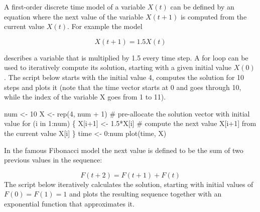 \documentclass[
  letterpaper,
  DIV=11,
  numbers=noendperiod]{scrreprt}
\newenvironment{Shaded}{\begin{snugshade}}{\end{snugshade}}
\newcommand{\NormalTok}[1]{\textcolor[rgb]{0.00,0.23,0.31}{#1}}
\begin{document}
A first-order discrete time model of a variable \(X(t)\) can be defined
by an equation where the next value of the variable \(X(t+1)\) is
computed from the current value \(X(t)\). For example the model

\[ X(t+1) = 1.5X(t)\]

describes a variable that is multiplied by 1.5 every time step. A for
loop can be used to iteratively compute its solution, starting with a
given initial value \(X(0)\). The script below starts with the initial
value 4, computes the solution for 10 steps and plots it (note that the
time vector starts at 0 and goes through 10, while the index of the
variable X goes from 1 to 11).

\begin{Shaded}
\begin{Highlighting}[]
\NormalTok{num \textless{}{-} 10}
\NormalTok{X \textless{}{-} rep(4, num + 1) \# pre{-}allocate the solution vector with initial value}
\NormalTok{for (i in 1:num) \{}
\NormalTok{  X[i+1] \textless{}{-} 1.5*X[i] \# compute the next value X[i+1] from the current value X[i]}
\NormalTok{\}}
\NormalTok{time \textless{}{-} 0:num}
\NormalTok{plot(time, X)}
\end{Highlighting}
\end{Shaded}

In the famous Fibonacci model the next value is defined to be the sum of
two previous values in the sequence:

\[ F(t+2) = F(t+1) + F(t)\] The script below iteratively calculates the
solution, starting with initial values of \(F(0)= F(1) = 1\) and plots
the resulting sequence together with an exponential function that
approximates it.
\end{document}
